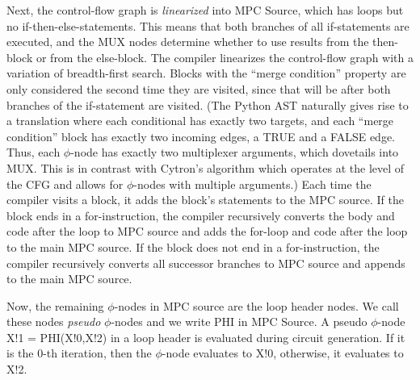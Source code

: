 Next, the control-flow graph is \emph{linearized} into MPC Source,
which has loops but no if-then-else-statements.
This means that both branches of all if-statements are executed,
and the MUX nodes determine whether to use results from the then-block or from the else-block.
The compiler linearizes the control-flow graph with a variation of breadth-first search.
Blocks with the ``merge condition'' property are only considered
the second time they are visited,
since that will be after both branches of the if-statement are visited.
(The Python AST naturally gives rise to a translation where each conditional has exactly two targets,
and each ``merge condition'' block has exactly two incoming edges, a TRUE and a FALSE edge.
Thus, each $\phi$-node has exactly two multiplexer arguments, which dovetails into MUX.
This is in contrast with Cytron's algorithm which operates at the level of the CFG and allows for
$\phi$-nodes with multiple arguments.)
Each time the compiler visits a block,
it adds the block's statements to the MPC source.
If the block ends in a for-instruction,
the compiler recursively converts the body and code after the loop to MPC source
and adds the for-loop and code after the loop to the main MPC source.
If the block does not end in a for-instruction,
the compiler recursively converts all successor branches to MPC source and
appends to the main MPC source.

Now, the remaining $\phi$-nodes in MPC source are the loop header nodes. We call these nodes \emph{pseudo} $\phi$-nodes
and we write {\sf PHI} in MPC Source. A pseudo $\phi$-node {\sf X!1 = PHI(X!0,X!2)} in a loop header is evaluated
during circuit generation. If it is the 0-th iteration, then the $\phi$-node evaluates to {\sf X!0}, otherwise, it evaluates to {\sf X!2}.


